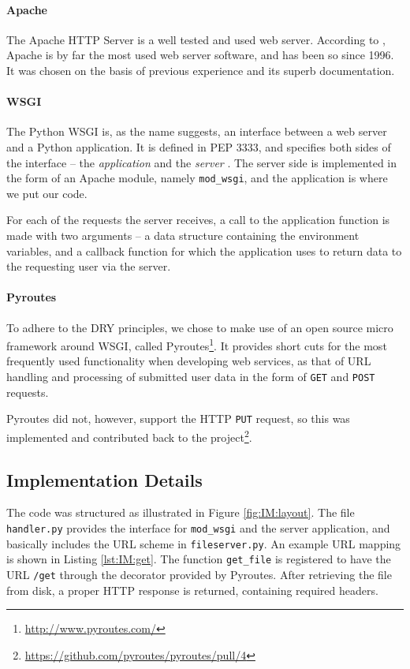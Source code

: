 \documentclass[pdftex,english,10pt,b5paper,twoside]{book}
\begin{document}
\paragraph{Apache} The Apache HTTP Server is a well tested and used web
server. According to \citet{netcraft}, Apache is by far the most used web server
software, and has been so since 1996. It was chosen on the basis of previous
experience and its superb documentation.

\paragraph{\acs{WSGI}} The Python \ac{WSGI} is, as the name suggests, an
interface between a web server and a Python application. It is defined in
\ac{PEP} 3333, and specifies both sides of the interface -- the
\emph{application} and the \emph{server} \cite{PEP-3333}. The server side is
implemented in the form of an Apache module, namely \texttt{mod\_wsgi}, and the
application is where we put our code.

For each of the requests the server receives, a call
to the application function is made with two arguments -- a data structure
containing the environment variables, and a callback function for which the
application uses to return data to the requesting user via the server.

\paragraph{Pyroutes} To adhere to the \ac{DRY} principles, we chose to make use
of an open source micro framework around \ac{WSGI}, called
Pyroutes\footnote{\url{http://www.pyroutes.com/}}. It provides short cuts for the
most frequently used functionality when developing web services, as that of
\ac{URL} handling and processing of submitted user data in the form of
\texttt{GET} and \texttt{POST} requests.

Pyroutes did not, however, support the HTTP \texttt{PUT} request, so this was
implemented and contributed back to the
project\footnote{\url{https://github.com/pyroutes/pyroutes/pull/4}}.

\subsection{Implementation Details}

The code was structured as illustrated in Figure \ref{fig:IM:layout}. The file
\texttt{handler.py} provides the interface for \texttt{mod\_wsgi} and the server
application, and basically includes the \ac{URL} scheme in
\texttt{fileserver.py}. An example \ac{URL} mapping is shown in Listing
\ref{lst:IM:get}. The function \texttt{get\_file} is registered to have the
\ac{URL} \texttt{/get} through the decorator provided by Pyroutes. After
retrieving the file from disk, a proper \ac{HTTP} response is returned,
containing required headers.
\end{document}
